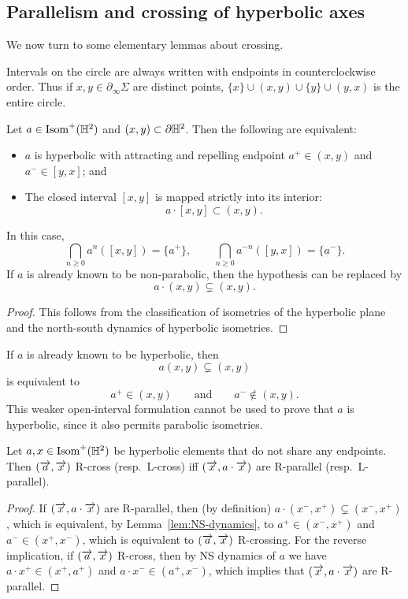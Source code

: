 \subsection{Parallelism and crossing of hyperbolic axes}
\label{subsec:parallel_crossing}
We now turn to some elementary lemmas about crossing.

\begin{convention}\label{conv:circle-intervals}
  Intervals on the circle are always written with endpoints in counterclockwise
  order. Thus if $x,y \in \partial_{\infty} \Sigma$ are distinct points,
  $\{x\} \cup (x,y) \cup \{y\}\cup (y,x)$ is the entire circle.
\end{convention}

\begin{lemma}\label{lem:NS-dynamics}
  Let $a \in \operatorname{Isom}^+(\mathbb{H}^2)$ and $(x,y) \subset \partial\mathbb{H}^2$. Then
  the following are equivalent:
  \begin{itemize}
  \item $a$ is hyperbolic with attracting and repelling
    endpoint $a^+ \in(x,y)$ and $a^- \in [y,x]$; and
\item The closed interval $[x,y]$ is mapped strictly into its
interior:
\[
a \cdot [x,y]\subset(x,y).
\]
  \end{itemize}
In this case,
\[
\bigcap_{n\geq 0}a^n([x,y])=\{a^+\},
\qquad
\bigcap_{n\geq 0}a^{-n}([y,x])=\{a^-\}.
\]
If $a$ is already known to be non-parabolic, then the hypothesis can be replaced by
\[
a\cdot(x,y)\subsetneq(x,y).
\]
\end{lemma}
\begin{proof}
  This follows from the classification of isometries of the hyperbolic
  plane and the north-south dynamics of hyperbolic isometries.
\end{proof}


\begin{remark}
If $a$ is already known to be hyperbolic, then
\[
a(x,y)\subsetneq(x,y)
\]
is equivalent to
\[
a^+\in(x,y)
\qquad\text{and}\qquad
a^-\notin(x,y).
\]
This weaker open-interval formulation cannot be used to prove that
$a$ is hyperbolic, since it also permits parabolic isometries.
\end{remark}

\begin{lemma}
  Let $a,x \in \operatorname{Isom}^+(\mathbb{H}^2)$ be hyperbolic elements that do not share any endpoints.
  Then $(\overrightarrow{a},\overrightarrow{x})$ R-cross (resp.\ L-cross) iff
  $(\overrightarrow{x}, a \cdot \overrightarrow{x})$ are R-parallel (resp.\ L-parallel).
 \label{lem:rhs}
\end{lemma}
\begin{proof}
  If $(\overrightarrow{x}, a\cdot\overrightarrow{x})$ are R-parallel, then (by
  definition) $a\cdot(x^-,x^+) \subsetneq (x^-,x^+)$,
  which is equivalent, by Lemma~\ref{lem:NS-dynamics}, to $a^+ \in (x^-,x^+)$ and
  $a^- \in (x^+,x^-)$, which is equivalent to
  $(\overrightarrow{a},\overrightarrow{x})$ R-crossing.
  For the reverse implication, if $(\overrightarrow{a},\overrightarrow{x})$ R-cross, then by
  NS dynamics of $a$ we have $a \cdot x^+ \in (x^+,a^+)$ and
  $a \cdot x^- \in (a^+,x^-)$, which implies that
  $(\overrightarrow{x},a \cdot \overrightarrow{x})$ are R-parallel.
\end{proof}

